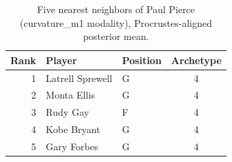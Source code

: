 \begin{table}[htbp]
  \centering\small
  \begin{tabular}{rllc}
    \toprule
    Rank & Player & Position & Archetype \\
    \midrule
    1 & Latrell Sprewell & G & 4 \\
    2 & Monta Ellis & G & 4 \\
    3 & Rudy Gay & F & 4 \\
    4 & Kobe Bryant & G & 4 \\
    5 & Gary Forbes & G & 4 \\
    \bottomrule
  \end{tabular}
  \caption{Five nearest neighbors of Paul Pierce (curvature_m1 modality), Procrustes-aligned posterior mean.}
  \label{tab:Paul_Pierce_neighbors_curvature_m1}
\end{table}

